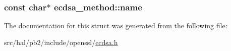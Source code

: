 \subsubsection[{\texorpdfstring{name}{name}}]{\setlength{\rightskip}{0pt plus 5cm}const char$\ast$ ecdsa\+\_\+method\+::name}\hypertarget{structecdsa__method_a350be654639d79dcf73933de20378c39}{}\label{structecdsa__method_a350be654639d79dcf73933de20378c39}


The documentation for this struct was generated from the following file\+:\begin{DoxyCompactItemize}
\item 
src/hal/pb2/include/openssl/\hyperlink{ecdsa_8h}{ecdsa.\+h}\end{DoxyCompactItemize}
